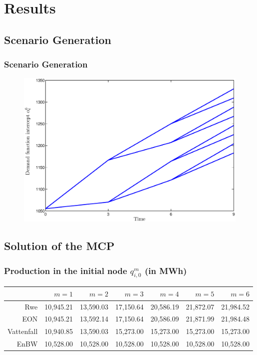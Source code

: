\section{Results}

\subsection{Scenario Generation}

\begin{frame}
  \frametitle{Scenario Generation}
\begin{figure}[h]
  \centering
\includegraphics[width=1\textwidth]{intercept}
  \label{fig:intercept}
\end{figure}  
\end{frame}


\subsection{Solution of the MCP}

\begin{frame}
  \frametitle{Production in the initial node $q_{i,0}^{m}$ (in MWh)}
  \begin{center}
\scriptsize
      \begin{tabular}{rrrrrrr}
\hline
           &     $m=1$ &     $m=2$ &     $m=3$ &     $m=4$ &     $m=5$ &     $m=6$ \\
\hline\hline
       Rwe &    10,945.21  &    13,590.03  &    17,150.64  &    20,586.19  &    21,872.07  &    21,984.52  \\

       EON &    10,945.21  &    13,592.14  &    17,150.64  &    20,586.09  &    21,871.99  &    21,984.48  \\

    Vattenfall &    10,940.85  &    13,590.03  &    15,273.00  &    15,273.00  &    15,273.00  &    15,273.00  \\

      EnBW &    10,528.00  &    10,528.00  &    10,528.00  &    10,528.00  &    10,528.00  &    10,528.00  \\
\hline
\end{tabular}
\normalsize
  \end{center}
\end{frame}



